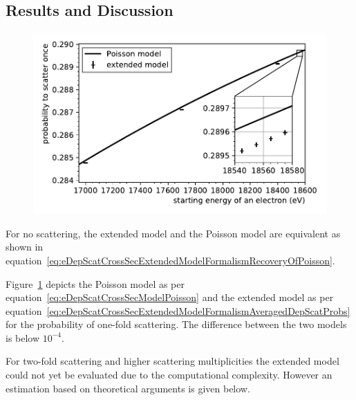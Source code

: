 \subsection{Results and Discussion}
\label{sec:eDepScatCrossSecExtendedModelDiscussion}
\begin{figure}[t]
	\centering
	\includegraphics{chapter/energyDependentCrossSec/fig/scatProbs1PoissonAndExtended.pdf}
	\label{fig:eDepScatCrossSecExtendedModelResults}
\end{figure}
For no scattering, the extended model and the Poisson model are equivalent as shown in equation~\eqref{eq:eDepScatCrossSecExtendedModelFormalismRecoveryOfPoisson}.

Figure~\ref{fig:eDepScatCrossSecExtendedModelResults} depicts the Poisson model as per equation~\eqref{eq:eDepScatCrossSecModelPoisson} and the extended model as per equation~\eqref{eq:eDepScatCrossSecExtendedModelFormalismAveragedDepScatProbs} for the probability of one-fold scattering. The difference between the two models is below $10^{-4}$.

For two-fold scattering and higher scattering multiplicities the extended model could not yet be evaluated due to the computational complexity. However an estimation based on theoretical arguments is given below.

